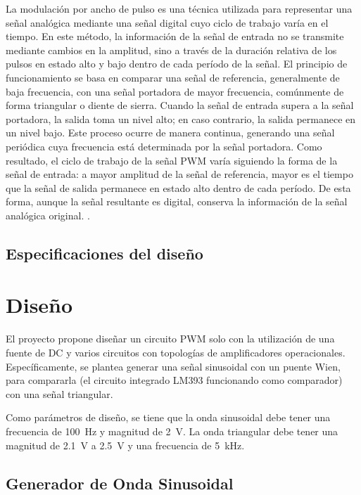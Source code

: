 \documentclass[journal, onecolumn]{IEEEtran}
\begin{document}
La modulación por ancho de pulso es una técnica utilizada para representar una señal analógica mediante una señal digital cuyo ciclo de trabajo varía en el tiempo. En este método, la información de la señal de entrada no se transmite mediante cambios en la amplitud, sino a través de la duración relativa de los pulsos en estado alto y bajo dentro de cada período de la señal. El principio de funcionamiento se basa en comparar una señal de referencia, generalmente de baja frecuencia, con una señal portadora de mayor frecuencia, comúnmente de forma triangular o diente de sierra. Cuando la señal de entrada supera a la señal portadora, la salida toma un nivel alto; en caso contrario, la salida permanece en un nivel bajo. Este proceso ocurre de manera continua, generando una señal periódica cuya frecuencia está determinada por la señal portadora. Como resultado, el ciclo de trabajo de la señal PWM varía siguiendo la forma de la señal de entrada: a mayor amplitud de la señal de referencia, mayor es el tiempo que la señal de salida permanece en estado alto dentro de cada período. De esta forma, aunque la señal resultante es digital, conserva la información de la señal analógica original. \cite{hart2011power} .
\subsection{Especificaciones del diseño}


\section{Diseño}
El proyecto propone diseñar un circuito PWM solo con la utilización de una fuente de DC y varios circuitos con topologías de amplificadores operacionales. Específicamente, se plantea generar una señal sinusoidal con un puente Wien, para compararla (el circuito integrado LM393 funcionando como comparador) con una señal triangular. 

Como parámetros de diseño, se tiene que la onda sinusoidal debe tener una frecuencia de 100~Hz y magnitud de 2~V. La onda triangular debe tener una magnitud de 2.1~V a 2.5~V y una frecuencia de 5~kHz.

\subsection{Generador de Onda Sinusoidal}
\end{document}
